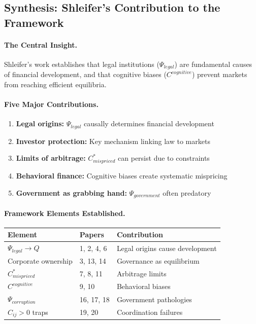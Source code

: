 \subsection{Synthesis: Shleifer's Contribution to the Framework}

\paragraph{The Central Insight.}
Shleifer's work establishes that legal institutions ($\Psi_{legal}$) are
fundamental causes of financial development, and that cognitive biases
($C^{cognitive}$) prevent markets from reaching efficient equilibria.

\paragraph{Five Major Contributions.}

\begin{enumerate}
  \item \textbf{Legal origins:} $\Psi_{legal}$ causally determines financial development
  \item \textbf{Investor protection:} Key mechanism linking law to markets
  \item \textbf{Limits of arbitrage:} $C^*_{mispriced}$ can persist due to constraints
  \item \textbf{Behavioral finance:} Cognitive biases create systematic mispricing
  \item \textbf{Government as grabbing hand:} $\Psi_{government}$ often predatory
\end{enumerate}

\paragraph{Framework Elements Established.}

\begin{center}
\renewcommand{\arraystretch}{1.2}
\small
\begin{tabular}{lll}
\hline
\textbf{Element} & \textbf{Papers} & \textbf{Contribution} \\
\hline
$\Psi_{legal} \to Q$ & 1, 2, 4, 6 & Legal origins cause development \\
Corporate ownership & 3, 13, 14 & Governance as equilibrium \\
$C^*_{mispriced}$ & 7, 8, 11 & Arbitrage limits \\
$C^{cognitive}$ & 9, 10 & Behavioral biases \\
$\Psi_{corruption}$ & 16, 17, 18 & Government pathologies \\
$C_{ij} > 0$ traps & 19, 20 & Coordination failures \\
\hline
\end{tabular}
\end{center}

